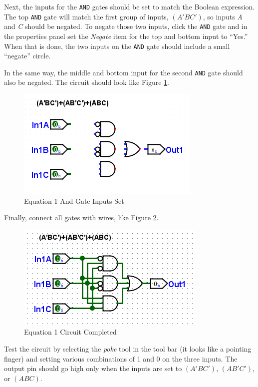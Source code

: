 Next, the inputs for the \texttt{AND} gates should be set to match the Boolean expression. The top \texttt{AND} gate will match the first group of inputs, $ (A'BC') $, so inputs \textit{A} and \textit{C} should be negated. To negate those two inputs, click the \texttt{AND} gate and in the properties panel set the \textit{Negate} item for the top and bottom input to ``Yes.'' When that is done, the two inputs on the \texttt{AND} gate should include a small ``negate'' circle.

In the same way, the middle and bottom input for the second \texttt{AND} gate should also be negated. The circuit should look like Figure \ref{fig:bool-03}.

\begin{figure}[H]
	\centering
	\includegraphics[width=\maxwidth{.95\linewidth}]{gfx/bool-03}
	\caption{Equation 1 And Gate Inputs Set}
	\label{fig:bool-03}
\end{figure}

Finally, connect all gates with wires, like Figure \ref{fig:bool-04}. 

\begin{figure}[H]
	\centering
	\includegraphics[width=\maxwidth{.95\linewidth}]{gfx/bool-04}
	\caption{Equation 1 Circuit Completed}
	\label{fig:bool-04}
\end{figure}

Test the circuit by selecting the \textit{poke} tool in the tool bar (it looks like a pointing finger) and setting various combinations of 1 and 0 on the three inputs. The output pin should go high only when the inputs are set to $ (A'BC') $, $ (AB'C') $, or $ (ABC) $.

